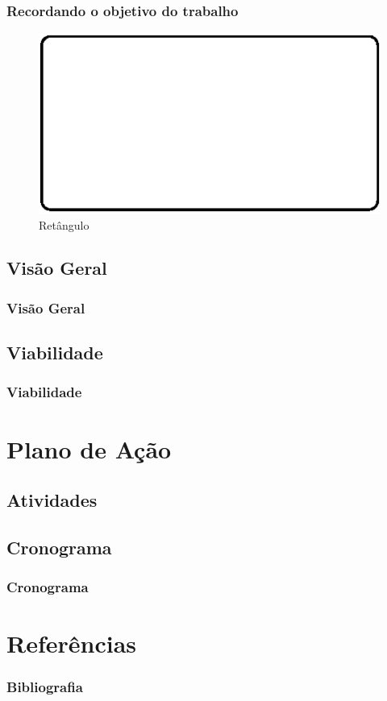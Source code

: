 \documentclass[hyperref={pdfpagelabels=false}]{beamer}
\begin{document}
\begin{frame}
	\frametitle{Recordando o objetivo do trabalho}
   
   	\begin{center}
   	\end{center}
   
    \begin{figure}[h]
    	\centering
	    \includegraphics[scale=0.6]{img/drawing.eps}
        \caption{Ret\^{a}ngulo}
    \end{figure}

\end{frame}

\subsection{Visão Geral}  

\begin{frame}
	\frametitle{Visão Geral}
   
\end{frame}
       
\subsection{Viabilidade}  

\begin{frame}
	\frametitle{Viabilidade}
   
\end{frame}

\section{Plano de Ação}

\subsection{Atividades}

\subsection{Cronograma}
\begin{frame}
	\frametitle{Cronograma}
\end{frame}


\section {Referências}
\begin{frame}
\frametitle{Bibliografia}
    
    \small{  }
\end{frame}
\end{document}
